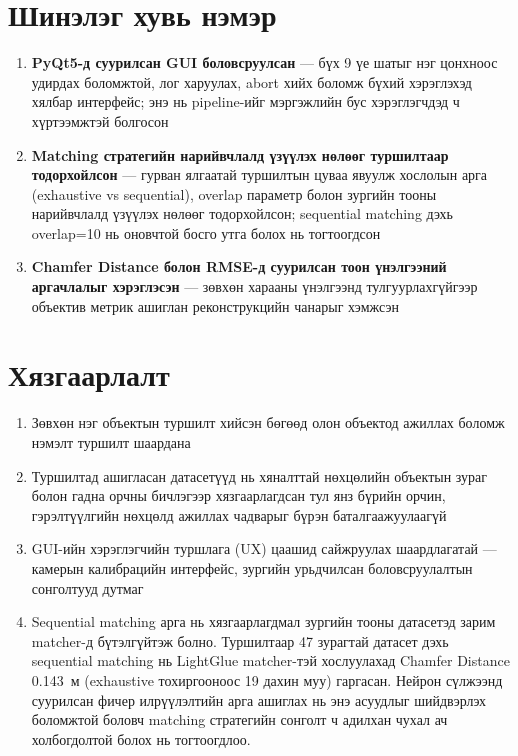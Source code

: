 \section{Шинэлэг хувь нэмэр}

\begin{enumerate}
    \item \textbf{PyQt5-д суурилсан GUI боловсруулсан} — бүх 9 үе шатыг нэг цонхноос удирдах боломжтой, лог харуулах, abort хийх боломж бүхий хэрэглэхэд хялбар интерфейс; энэ нь pipeline-ийг мэргэжлийн бус хэрэглэгчдэд ч хүртээмжтэй болгосон
    \item \textbf{Matching стратегийн нарийвчлалд үзүүлэх нөлөөг туршилтаар тодорхойлсон} — гурван ялгаатай туршилтын цуваа явуулж хослолын арга (exhaustive vs sequential), overlap параметр болон зургийн тооны нарийвчлалд үзүүлэх нөлөөг тодорхойлсон; sequential matching дэхь overlap=10 нь оновчтой босго утга болох нь тогтоогдсон
    \item \textbf{Chamfer Distance болон RMSE-д суурилсан тоон үнэлгээний аргачлалыг хэрэглэсэн} — зөвхөн харааны үнэлгээнд тулгуурлахгүйгээр объектив метрик ашиглан реконструкцийн чанарыг хэмжсэн
\end{enumerate}

\section{Хязгаарлалт}

\begin{enumerate}
    \item Зөвхөн нэг объектын туршилт хийсэн бөгөөд олон объектод ажиллах боломж нэмэлт туршилт шаардана
    \item Туршилтад ашигласан датасетүүд нь хяналттай нөхцөлийн объектын зураг болон гадна орчны бичлэгээр хязгаарлагдсан тул янз бүрийн орчин, гэрэлтүүлгийн нөхцөлд ажиллах чадварыг бүрэн баталгаажуулаагүй
    \item GUI-ийн хэрэглэгчийн туршлага (UX) цаашид сайжруулах шаардлагатай — камерын калибрацийн интерфейс, зургийн урьдчилсан боловсруулалтын сонголтууд дутмаг
    \item Sequential matching арга нь хязгаарлагдмал зургийн тооны датасетэд зарим matcher-д бүтэлгүйтэж болно. Туршилтаар 47 зурагтай датасет дэхь sequential matching нь LightGlue matcher-тэй хослуулахад Chamfer Distance 0.143~м (exhaustive тохиргооноос 19 дахин муу) гаргасан. Нейрон сүлжээнд суурилсан фичер илрүүлэлтийн арга ашиглах нь энэ асуудлыг шийдвэрлэх боломжтой боловч matching стратегийн сонголт ч адилхан чухал ач холбогдолтой болох нь тогтоогдлоо.
\end{enumerate}

